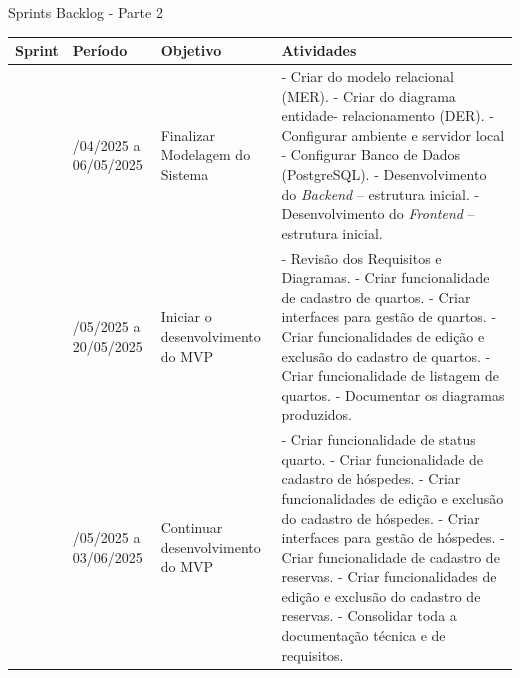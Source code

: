 \documentclass[
	12pt,				%
	openany,			%
	oneside,			%
	a4paper,			%
	english,			%
	french,				%
	spanish,			%
	brazil				%
	]{abntex2}
\begin{document}
\begin{quadro}[H]
	\caption{Sprints Backlog - Parte 2}
	\label{sprints_backlog_2} 
	\begin{tabular}{|>{\centering\arraybackslash}m{1.2cm}|>{\centering\arraybackslash}m{3cm}|>{\centering\arraybackslash}m{4.5cm}|>{\raggedright\arraybackslash}m{5.5cm}|}
		\hline
		\textbf{Sprint} & \textbf{Período} & \textbf{Objetivo} & \textbf{Atividades} \\
		\hline	
		3 & 23/04/2025 a 06/05/2025 & Finalizar Modelagem do Sistema &
		- Criar do modelo relacional (MER). \newline - Criar do diagrama entidade- relacionamento (DER). \newline - Configurar ambiente e servidor local \newline - Configurar Banco de Dados (PostgreSQL). \newline - Desenvolvimento do \textit{Backend} – estrutura inicial. \newline - Desenvolvimento do \textit{Frontend} – estrutura inicial.	\\	\hline
		4 & 07/05/2025 a 20/05/2025 & Iniciar o desenvolvimento do MVP & - Revisão dos Requisitos e Diagramas. \newline - Criar funcionalidade de cadastro de quartos. \newline - Criar interfaces para gestão de quartos. \newline - Criar funcionalidades de edição e exclusão do cadastro de quartos. \newline - Criar funcionalidade de listagem de quartos.\newline
		- Documentar os diagramas produzidos. \\ \hline	
		5 & 21/05/2025 a 03/06/2025 & Continuar desenvolvimento do MVP & - Criar funcionalidade de status quarto. \newline - Criar funcionalidade de cadastro de hóspedes. \newline - Criar funcionalidades de edição e exclusão do cadastro de hóspedes. \newline - Criar interfaces para gestão de hóspedes. \newline - Criar funcionalidade de cadastro de reservas. \newline - Criar funcionalidades de edição e exclusão do cadastro de reservas. \newline - Consolidar toda a documentação técnica e de requisitos. \\ \hline
	\end{tabular}
\end{quadro}
\end{document}
